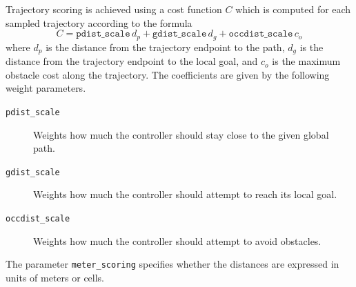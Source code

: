 \documentclass[10pt,journal,compsoc]{IEEEtran}
\begin{document}
Trajectory scoring is achieved using a cost function $C$ which is computed for each sampled trajectory according to the formula
\begin{equation}
\label{eqn:cost_function}
C = \mathtt{pdist\_scale} \, d_p + \mathtt{gdist\_scale} \, d_g + \mathtt{occdist\_scale} \, c_o
\end{equation}
where $d_p$ is the distance from the trajectory endpoint to the path, $d_g$ is the distance from the trajectory endpoint to the local goal, and $c_o$ is the maximum obstacle cost along the trajectory. The coefficients are given by the following weight parameters.
\begin{description}
\item[\texttt{pdist\_scale}] Weights how much the controller should stay close to the given global path.
\item[\texttt{gdist\_scale}] Weights how much the controller should attempt to reach its local goal.
\item[\texttt{occdist\_scale}] Weights how much the controller should attempt to avoid obstacles.
\end{description}
The parameter \texttt{meter\_scoring} specifies whether the distances are expressed in units of meters or cells. 
\end{document}

